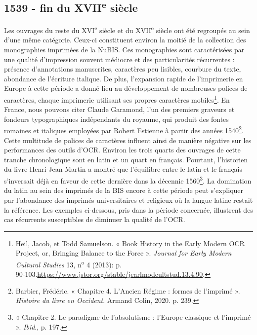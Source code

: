 \documentclass[a4paper,12pt,twoside]{book}
\begin{document}
\subsection{1539 - fin du XVII\textsuperscript{e} siècle}

Les ouvrages du reste du XVI\textsuperscript{e} siècle et du
XVII\textsuperscript{e} siècle ont été regroupés au sein d'une même
catégorie. Ceux-ci constituent environ la moitié de la collection des
monographies imprimées de la NuBIS. Ces monographies sont caractérisées
par une qualité d'impression souvent médiocre et des particularités
récurrentes : présence d'annotations manuscrites, caractères peu
lisibles, courbure du texte, abondance de l'écriture italique. De plus,
l'expansion rapide de l'imprimerie en Europe à cette période a donné
lieu au développement de nombreuses polices de caractères, chaque
imprimerie utilisant ses propres caractères mobiles\footnote{Heil,
	Jacob, et Todd Samuelson. « Book History in the Early Modern OCR
	Project, or, Bringing Balance to the Force ». \emph{Journal for Early
		Modern Cultural Studies} 13, n\textsuperscript{o} 4 (2013): p.
	90‑103.\url{https://www.jstor.org/stable/jearlmodcultstud.13.4.90}.}. En France, nous pouvons citer Claude Garamond, l'un des premiers graveurs et fondeurs typographiques indépendants du royaume, qui produit des fontes romaines et italiques employées par Robert Estienne à partir des années 1540\footnote{Barbier, Frédéric. « Chapitre 4. L'Ancien Régime : formes de l'imprimé ». \emph{Histoire du livre en Occident}. Armand Colin, 2020. p. 239.}. \\

Cette multitude de polices de caractères influent ainsi de manière négative sur les performances des outils
d'OCR. Environ les trois quarts des ouvrages de cette tranche
chronologique sont en latin et un quart en français. Pourtant, l'historien du livre Henri-Jean Martin a montré que l'équilibre entre le latin et le français s'inversait déjà en faveur de cette dernière dans la décennie 1560\footnote{« Chapitre 2. Le paradigme de l'absolutisme : l'Europe classique et l'imprimé ». \emph{Ibid}., p. 197.}. La domination du latin au sein des imprimés de la BIS encore à cette période peut s'expliquer par l'abondance des imprimés universitaires et religieux où la langue latine restait la référence. Les exemples
ci-dessous, pris dans la période concernée, illustrent des cas
récurrents susceptibles de diminuer la qualité de l'OCR.
\end{document}
